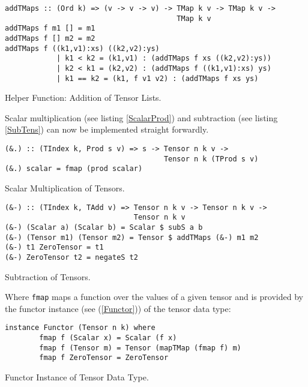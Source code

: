 \begin{listing}[hbt!] 
\begin{verbatim}
addTMaps :: (Ord k) => (v -> v -> v) -> TMap k v -> TMap k v ->
                                        TMap k v 
addTMaps f m1 [] = m1 
addTMaps f [] m2 = m2 
addTMaps f ((k1,v1):xs) ((k2,v2):ys) 
            | k1 < k2 = (k1,v1) : (addTMaps f xs ((k2,v2):ys))
            | k2 < k1 = (k2,v2) : (addTMaps f ((k1,v1):xs) ys)
            | k1 == k2 = (k1, f v1 v2) : (addTMaps f xs ys) 
\end{verbatim} 
\caption{Helper Function: Addition of Tensor Lists.}\label{addTmaps}
\end{listing}

Scalar multiplication (see listing \ref{ScalarProd}) and subtraction (see listing \ref{SubTens}) can now be implemented straight forwardly.
\begin{listing}[hbt!] 
\begin{verbatim}
(&.) :: (TIndex k, Prod s v) => s -> Tensor n k v ->
                                     Tensor n k (TProd s v)
(&.) scalar = fmap (prod scalar)
\end{verbatim} 
\caption{Scalar Multiplication of Tensors.}\label{ScalarProd}
\end{listing}

\begin{listing}[hbt!] 
\begin{verbatim}
(&-) :: (TIndex k, TAdd v) => Tensor n k v -> Tensor n k v ->
                              Tensor n k v
(&-) (Scalar a) (Scalar b) = Scalar $ subS a b
(&-) (Tensor m1) (Tensor m2) = Tensor $ addTMaps (&-) m1 m2
(&-) t1 ZeroTensor = t1
(&-) ZeroTensor t2 = negateS t2
\end{verbatim} 
\caption{Subtraction of Tensors.}\label{SubTens}
\end{listing}
Where \texttt{fmap} maps a function over the values of a given tensor and is provided by the functor instance (see (\ref{Functor})) of the tensor data type:

\begin{listing}[hbt!] 
\begin{verbatim}
instance Functor (Tensor n k) where 
        fmap f (Scalar x) = Scalar (f x)
        fmap f (Tensor m) = Tensor (mapTMap (fmap f) m)
        fmap f ZeroTensor = ZeroTensor 
\end{verbatim}
\caption{Functor Instance of Tensor Data Type.}\label{Functor}
\end{listing}

